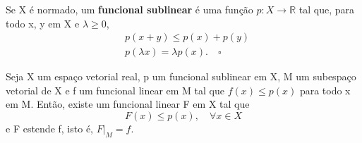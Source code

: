 \documentclass[../functional_analysis.tex]{subfiles}
\begin{document}
 \begin{def*}
   Se X é normado, um \textbf{funcional sublinear} é uma função \(p:X\rightarrow \mathbb{R}\) tal que, para todo x, y em X e \(\lambda \geq 0\),
    \begin{align*}
      & p(x+y)\leq p(x)+p(y)\\ 
      & p(\lambda x) = \lambda p(x).\quad \square
    \end{align*}
 \end{def*}
  \hypertarget{hahn_banach}{ 
    \begin{theorem*}
   Seja X um espaço vetorial real, p um funcional sublinear em X, M um subespaço vetorial de X e f um funcional linear em M tal que \(f(x)\leq p(x)\) para todo x em M. Então, existe um funcional linear F em X tal que 
     \[
       F(x)\leq p(x),\quad \forall x\in X
     \]
  e F estende f, isto é, \(F|_{M}=f.\)
 \end{theorem*}}
\end{document}
